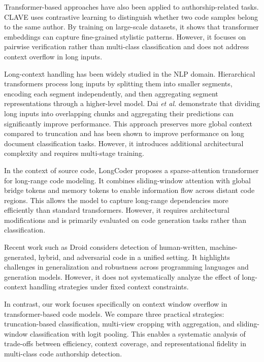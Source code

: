 \documentclass[conference]{IEEEtran}
\begin{document}
Transformer-based approaches have also been applied to authorship-related tasks. CLAVE \cite{alvarezfidalgo2025clave} uses contrastive learning to distinguish whether two code samples belong to the same author. By training on large-scale datasets, it shows that transformer embeddings can capture fine-grained stylistic patterns. However, it focuses on pairwise verification rather than multi-class classification and does not address context overflow in long inputs.

Long-context handling has been widely studied in the NLP domain. Hierarchical transformers \cite{pappagari2019} process long inputs by splitting them into smaller segments, encoding each segment independently, and then aggregating segment representations through a higher-level model. Dai \textit{et al.} \cite{dai2022revisiting} demonstrate that dividing long inputs into overlapping chunks and aggregating their predictions can significantly improve performance. This approach preserves more global context compared to truncation and has been shown to improve performance on long document classification tasks. However, it introduces additional architectural complexity and requires multi-stage training.

In the context of source code, LongCoder \cite{guo2023longcoder} proposes a sparse-attention transformer for long-range code modeling. It combines sliding-window attention with global bridge tokens and memory tokens to enable information flow across distant code regions. This allows the model to capture long-range dependencies more efficiently than standard transformers. However, it requires architectural modifications and is primarily evaluated on code generation tasks rather than classification. 

Recent work such as Droid \cite{orel-etal-2025-droid} considers detection of human-written, machine-generated, hybrid, and adversarial code in a unified setting. It highlights challenges in generalization and robustness across programming languages and generation models. However, it does not systematically analyze the effect of long-context handling strategies under fixed context constraints.

In contrast, our work focuses specifically on context window overflow in transformer-based code models. We compare three practical strategies: truncation-based classification, multi-view cropping with aggregation, and sliding-window classification with logit pooling. This enables a systematic analysis of trade-offs between efficiency, context coverage, and representational fidelity in multi-class code authorship detection.
\end{document}
